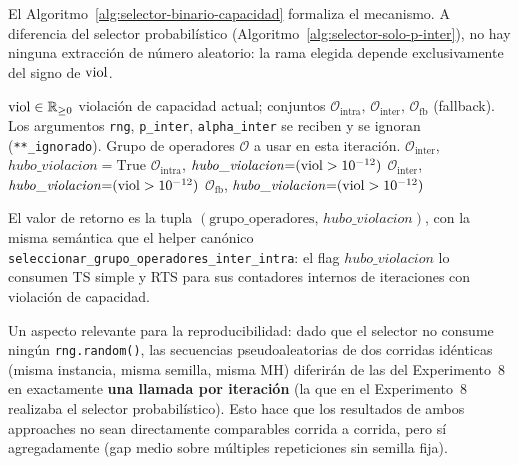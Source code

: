 El Algoritmo~\ref{alg:selector-binario-capacidad} formaliza el
mecanismo. A diferencia del selector probabilístico
(Algoritmo~\ref{alg:selector-solo-p-inter}), no hay ninguna extracción
de número aleatorio: la rama elegida depende exclusivamente del signo
de $\mathrm{viol}$.

\begin{algorithm}[h]
\caption{Selector binario determinista basado en capacidad
         (\texttt{seleccionar\_grupo\_strict}).}
\label{alg:selector-binario-capacidad}
\begin{algorithmic}[1]
\Require $\mathrm{viol} \in \mathbb{R}_{\ge 0}$ violación de capacidad actual;
  conjuntos $\mathcal{O}_{\text{intra}},\,\mathcal{O}_{\text{inter}},\,\mathcal{O}_{\text{fb}}$
  (fallback).
  Los argumentos \texttt{rng}, \texttt{p\_inter}, \texttt{alpha\_inter}
  se reciben y se ignoran (\texttt{**\_ignorado}).
\Ensure Grupo de operadores $\mathcal{O}$ a usar en esta iteración.
  \State \Return $\mathcal{O}_{\text{inter}}$, $\mathit{hubo\_violacion}{=}\mathrm{True}$
  \State \Return $\mathcal{O}_{\text{intra}}$, $\mathit{hubo\_violacion}{=}(\mathrm{viol} > 10^{-12})$
  \State \Return $\mathcal{O}_{\text{inter}}$, $\mathit{hubo\_violacion}{=}(\mathrm{viol} > 10^{-12})$
\Else
  \State \Return $\mathcal{O}_{\text{fb}}$, $\mathit{hubo\_violacion}{=}(\mathrm{viol} > 10^{-12})$
\EndIf
\end{algorithmic}
\end{algorithm}

El valor de retorno es la tupla
$(\text{grupo\_operadores},\,\mathit{hubo\_violacion})$, con la misma
semántica que el helper canónico
\texttt{seleccionar\_grupo\_operadores\_inter\_intra}: el flag
$\mathit{hubo\_violacion}$ lo consumen TS simple y RTS para sus
contadores internos de iteraciones con violación de capacidad.

Un aspecto relevante para la reproducibilidad: dado que el selector no
consume ningún \texttt{rng.random()}, las secuencias pseudoaleatorias
de dos corridas idénticas (misma instancia, misma semilla, misma MH)
diferirán de las del Experimento~8 en exactamente \textbf{una llamada
por iteración} (la que en el Experimento~8 realizaba el selector
probabilístico). Esto hace que los resultados de ambos approaches no
sean directamente comparables corrida a corrida, pero sí agregadamente
(gap medio sobre múltiples repeticiones sin semilla fija).

